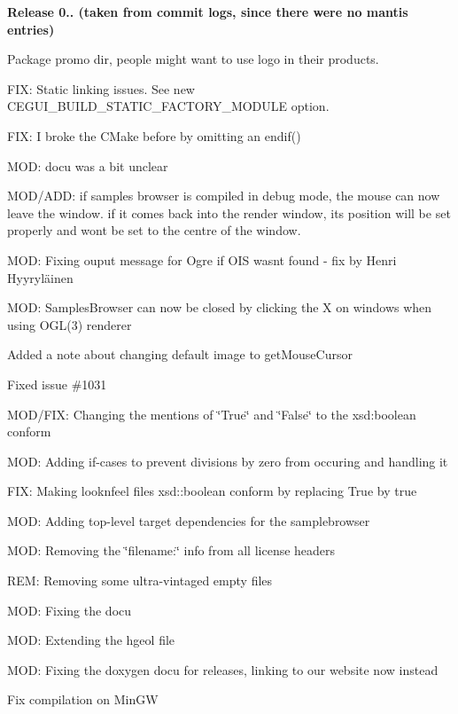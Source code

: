 {\bfseries{Release 0.. (taken from commit logs, since there were no mantis entries)}}
\begin{DoxyItemize}
\item Package \textquotesingle{}promo\textquotesingle{} dir, people might want to use logo in their products.
\item F\+IX\+: Static linking issues. See new C\+E\+G\+U\+I\+\_\+\+B\+U\+I\+L\+D\+\_\+\+S\+T\+A\+T\+I\+C\+\_\+\+F\+A\+C\+T\+O\+R\+Y\+\_\+\+M\+O\+D\+U\+LE option.
\item F\+IX\+: I broke the C\+Make before by omitting an endif()
\item M\+OD\+: docu was a bit unclear
\item M\+O\+D/\+A\+DD\+: if samples browser is compiled in debug mode, the mouse can now leave the window. if it comes back into the render window, its position will be set properly and won\textquotesingle{}t be set to the centre of the window.
\item M\+OD\+: Fixing ouput message for Ogre if O\+IS wasnt found -\/ fix by Henri Hyyryläinen
\item M\+OD\+: Samples\+Browser can now be closed by clicking the \textquotesingle{}X\textquotesingle{} on windows when using O\+G\+L(3) renderer
\item Added a note about changing default image to get\+Mouse\+Cursor
\item Fixed issue \#1031
\item M\+O\+D/\+F\+IX\+: Changing the mentions of \char`\"{}\+True\char`\"{} and \char`\"{}\+False\char`\"{} to the xsd\+:boolean conform
\item M\+OD\+: Adding if-\/cases to prevent divisions by zero from occuring and handling it
\item F\+IX\+: Making looknfeel files xsd\+::boolean conform by replacing True by true
\item M\+OD\+: Adding top-\/level target dependencies for the samplebrowser
\item M\+OD\+: Removing the \char`\"{}filename\+:\char`\"{} info from all license headers
\item R\+EM\+: Removing some ultra-\/vintaged empty files
\item M\+OD\+: Fixing the docu
\item M\+OD\+: Extending the hgeol file
\item M\+OD\+: Fixing the doxygen docu for releases, linking to our website now instead
\item Fix compilation on Min\+GW

\end{DoxyItemize}
